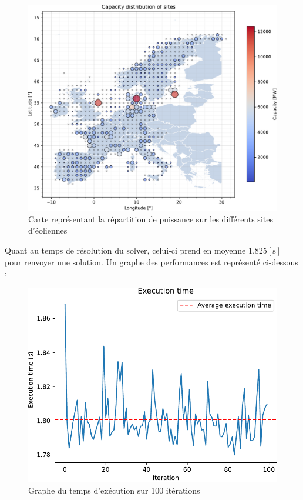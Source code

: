 \documentclass{article}
\newlength{\temp}
\begin{document}
\begin{figure}[h!]
    \centering
    \includegraphics[scale=0.4]{Images/Partie_1/Q1/capacity_distribution.pdf}
    \caption{Carte représentant la répartition de puissance sur les différents sites d'éoliennes}
    \label{fig:capacity_distribution_partie1}
\end{figure}

\newpage

Quant au temps de résolution du solver, celui-ci prend en moyenne $1.825 [\mathrm{s}]$ pour renvoyer une solution. Un graphe des performances est représenté ci-dessous :

\begin{figure}[h!]
    \centering
    \includegraphics[scale=0.5]{Images/Partie_1/Q1/execution_time.pdf}
    \caption{Graphe du temps d'exécution sur 100 itérations}
    \label{fig:execution_time_partie1}
\end{figure}
\end{document}
